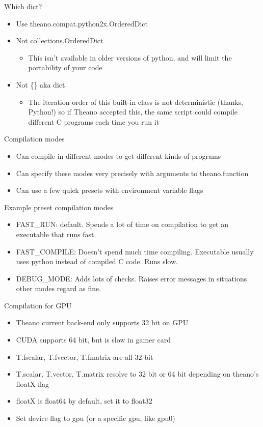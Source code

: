 \documentclass[utf8x]{beamer}
\begin{document}
\begin{frame}{Which dict?}
  \begin{itemize}
  \item Use theano.compat.python2x.OrderedDict
  \item Not collections.OrderedDict
  \begin{itemize}
  \item This isn’t available in older versions of python,
and will limit the portability of your code
  \end{itemize}
  \item Not \{\} aka dict
  \begin{itemize}
  \item The iteration order of this built-in class is not
    deterministic (thanks, Python!) so if Theano
    accepted this, the same script could compile
    different C programs each time you run it
  \end{itemize}
  \end{itemize}
\end{frame}

\begin{frame}{Compilation modes}
  \begin{itemize}
  \item Can compile in different modes to get different kinds of programs
  \item Can specify these modes very precisely with arguments to theano.function
  \item Can use a few quick presets with environment variable flags
  \end{itemize}
\end{frame}

\begin{frame}{Example preset compilation modes}
  \begin{itemize}
  \item FAST\_RUN: default. Spends a lot of time on
compilation to get an executable that runs
fast.
  \item FAST\_COMPILE: Doesn’t spend much time
compiling. Executable usually uses python
instead of compiled C code. Runs slow.
  \item DEBUG\_MODE: Adds lots of checks.
Raises error messages in situations other
modes regard as fine.
  \end{itemize}
\end{frame}

\begin{frame}{Compilation for GPU}
  \begin{itemize}
  \item Theano current back-end only supports 32 bit on GPU
  \item CUDA supports 64 bit, but is slow in gamer card
  \item T.fscalar, T.fvector, T.fmatrix are all 32 bit
  \item T.scalar, T.vector, T.matrix resolve to 32 bit or 64 bit depending on theano’s floatX flag
  \item floatX is float64 by default, set it to float32
  \item Set device flag to gpu (or a specific gpu, like gpu0)
  \end{itemize}
\end{frame}
\end{document}

